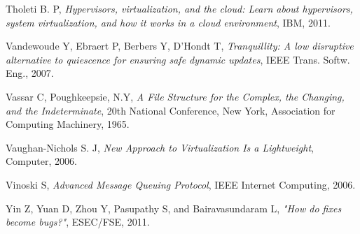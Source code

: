\documentclass[a4paper,11pt,twoside]{report}
\begin{document}
\begin{thebibliography}{1}
 Tholeti B. P, {\em Hypervisors, virtualization, and the cloud: Learn about hypervisors, system virtualization, and how it works in a cloud environment}, IBM, 2011. 

Vandewoude Y, Ebraert P, Berbers Y, D'Hondt T, {\em Tranquillity: A low disruptive alternative to quiescence for ensuring safe dynamic updates}, IEEE Trans. Softw. Eng., 2007.

 Vassar C, Poughkeepsie, N.Y, \textit{A File Structure for the Complex, the Changing, and the Indeterminate}, 20th National Conference, New York, Association for Computing Machinery, 1965.

 Vaughan-Nichols S. J, {\em New Approach to Virtualization Is a Lightweight}, Computer, 2006. 
 
 Vinoski S, {\em Advanced Message Queuing Protocol}, IEEE Internet Computing, 2006. 

 Yin Z, Yuan D, Zhou Y, Pasupathy S, and Bairavasundaram L, \textit{"How do fixes become bugs?"}, ESEC/FSE, 2011.

\end{thebibliography} 
\end{document}
